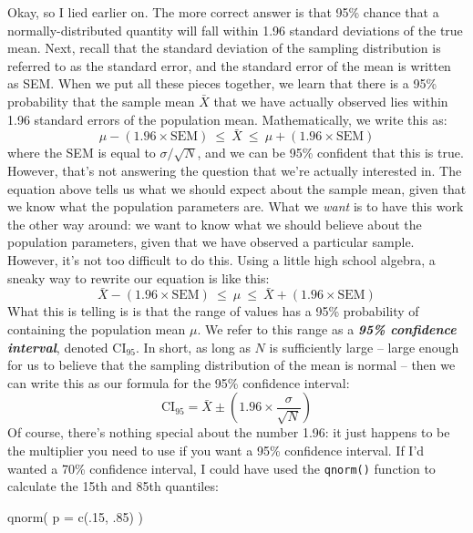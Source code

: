 \documentclass[
]{book}
\newenvironment{Shaded}{\begin{snugshade}}{\end{snugshade}}
\newcommand{\AttributeTok}[1]{\textcolor[rgb]{0.77,0.63,0.00}{#1}}
\newcommand{\DecValTok}[1]{\textcolor[rgb]{0.00,0.00,0.81}{#1}}
\newcommand{\FunctionTok}[1]{\textcolor[rgb]{0.00,0.00,0.00}{#1}}
\newcommand{\NormalTok}[1]{#1}
\begin{document}
Okay, so I lied earlier on. The more correct answer is that 95\% chance that a normally-distributed quantity will fall within 1.96 standard deviations of the true mean. Next, recall that the standard deviation of the sampling distribution is referred to as the standard error, and the standard error of the mean is written as SEM. When we put all these pieces together, we learn that there is a 95\% probability that the sample mean \(\bar{X}\) that we have actually observed lies within 1.96 standard errors of the population mean. Mathematically, we write this as:
\[
\mu - \left( 1.96 \times \mbox{SEM} \right) \ \leq \  \bar{X}\  \leq \  \mu + \left( 1.96 \times \mbox{SEM} \right) 
\]
where the SEM is equal to \(\sigma / \sqrt{N}\), and we can be 95\% confident that this is true. However, that's not answering the question that we're actually interested in. The equation above tells us what we should expect about the sample mean, given that we know what the population parameters are. What we \emph{want} is to have this work the other way around: we want to know what we should believe about the population parameters, given that we have observed a particular sample. However, it's not too difficult to do this. Using a little high school algebra, a sneaky way to rewrite our equation is like this:
\[
\bar{X} -  \left( 1.96 \times \mbox{SEM} \right) \ \leq \ \mu  \ \leq  \ \bar{X} +  \left( 1.96 \times \mbox{SEM}\right)
\]
What this is telling is is that the range of values has a 95\% probability of containing the population mean \(\mu\). We refer to this range as a \textbf{\emph{95\% confidence interval}}, denoted \(\mbox{CI}_{95}\). In short, as long as \(N\) is sufficiently large -- large enough for us to believe that the sampling distribution of the mean is normal -- then we can write this as our formula for the 95\% confidence interval:
\[
\mbox{CI}_{95} = \bar{X} \pm \left( 1.96 \times \frac{\sigma}{\sqrt{N}} \right)
\]
Of course, there's nothing special about the number 1.96: it just happens to be the multiplier you need to use if you want a 95\% confidence interval. If I'd wanted a 70\% confidence interval, I could have used the \texttt{qnorm()} function to calculate the 15th and 85th quantiles:

\begin{Shaded}
\begin{Highlighting}[]
\FunctionTok{qnorm}\NormalTok{( }\AttributeTok{p =} \FunctionTok{c}\NormalTok{(.}\DecValTok{15}\NormalTok{, .}\DecValTok{85}\NormalTok{) )}
\end{Highlighting}
\end{Shaded}
\end{document}
